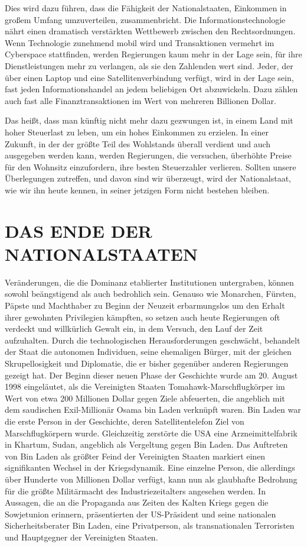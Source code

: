 \documentclass[
  a5paper,
  smalldemyvopaper,10pt,twoside,onecolumn,openright,extrafontsizes,hidelinks]{memoir}
\begin{document}
Dies wird dazu führen, dass die Fähigkeit der Nationalstaaten, Einkommen
in großem Umfang umzuverteilen, zusammenbricht. Die
Informationstechnologie nährt einen dramatisch verstärkten Wettbewerb
zwischen den Rechtsordnungen. Wenn Technologie zunehmend mobil wird und
Transaktionen vermehrt im Cyberspace stattfinden, werden Regierungen
kaum mehr in der Lage sein, für ihre Dienstleistungen mehr zu verlangen,
als sie den Zahlenden wert sind. Jeder, der über einen Laptop und eine
Satellitenverbindung verfügt, wird in der Lage sein, fast jeden
Informationshandel an jedem beliebigen Ort abzuwickeln. Dazu zählen auch
fast alle Finanztransaktionen im Wert von mehreren Billionen Dollar.

Das heißt, dass man künftig nicht mehr dazu gezwungen ist, in einem Land
mit hoher Steuerlast zu leben, um ein hohes Einkommen zu erzielen. In
einer Zukunft, in der der größte Teil des Wohlstands überall verdient
und auch ausgegeben werden kann, werden Regierungen, die versuchen,
überhöhte Preise für den Wohnsitz einzufordern, ihre besten Steuerzahler
verlieren. Sollten unsere Überlegungen zutreffen, und davon sind wir
überzeugt, wird der Nationalstaat, wie wir ihn heute kennen, in seiner
jetzigen Form nicht bestehen bleiben.

\section{DAS ENDE DER
NATIONALSTAATEN}\label{das-ende-der-nationalstaaten}

Veränderungen, die die Dominanz etablierter Institutionen untergraben,
können sowohl beängstigend als auch bedrohlich sein. Genauso wie
Monarchen, Fürsten, Päpste und Machthaber zu Beginn der Neuzeit
erbarmungslos um den Erhalt ihrer gewohnten Privilegien kämpften, so
setzen auch heute Regierungen oft verdeckt und willkürlich Gewalt ein,
in dem Versuch, den Lauf der Zeit aufzuhalten. Durch die technologischen
Herausforderungen geschwächt, behandelt der Staat die autonomen
Individuen, seine ehemaligen Bürger, mit der gleichen Skrupellosigkeit
und Diplomatie, die er bisher gegenüber anderen Regierungen gezeigt hat.
Der Beginn dieser neuen Phase der Geschichte wurde am 20. August 1998
eingeläutet, als die Vereinigten Staaten Tomahawk-Marschflugkörper im
Wert von etwa 200 Millionen Dollar gegen Ziele abfeuerten, die angeblich
mit dem saudischen Exil-Millionär Osama bin Laden verknüpft waren. Bin
Laden war die erste Person in der Geschichte, deren Satellitentelefon
Ziel von Marschflugkörpern wurde. Gleichzeitig zerstörte die USA eine
Arzneimittelfabrik in Khartum, Sudan, angeblich als Vergeltung gegen Bin
Laden. Das Auftreten von Bin Laden als größter Feind der Vereinigten
Staaten markiert einen signifikanten Wechsel in der Kriegsdynamik. Eine
einzelne Person, die allerdings über Hunderte von Millionen Dollar
verfügt, kann nun als glaubhafte Bedrohung für die größte Militärmacht
des Industriezeitalters angesehen werden. In Aussagen, die an die
Propaganda aus Zeiten des Kalten Kriegs gegen die Sowjetunion erinnern,
präsentierten der US-Präsident und seine nationalen Sicherheitsberater
Bin Laden, eine Privatperson, als transnationalen Terroristen und
Hauptgegner der Vereinigten Staaten.
\end{document}

